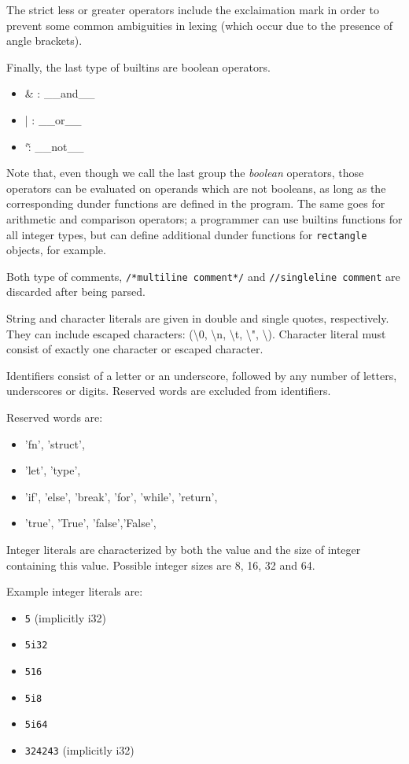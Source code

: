 \documentclass[times, utf8, diplomski]{fer}
\theoremstyle{definition}
\begin{document}
The strict less or greater operators include the exclaimation mark in order to
prevent some common ambiguities in lexing (which occur due to the presence of angle
brackets).

Finally, the last type of builtins are boolean operators.

\begin{itemize}
    \item \& : \_\_and\_\_
    \item | : \_\_or\_\_
    \item \char`\~ : \_\_not\_\_
\end{itemize}

Note that, even though we call the last group the \textit{boolean} operators,
those operators can be evaluated on operands which are not booleans,
as long as the corresponding dunder functions are defined in the program.
The same goes for arithmetic and comparison operators; a programmer can use
builtins functions for all integer types, but can define additional dunder functions
for \texttt{rectangle} objects, for example.

Both type of comments, \texttt{/*multiline comment*/} and \texttt{//singleline comment} are discarded
after being parsed.

String and character literals are given in double and single quotes, respectively.
They can include escaped characters:  (\textbackslash 0, \textbackslash n, \textbackslash t, 
\textbackslash ", \textbackslash \textquotesingle). 
Character literal must consist of exactly one character or escaped character.

Identifiers consist of a letter or an underscore, followed by any number of letters, underscores or digits.
Reserved words are excluded from identifiers.

Reserved words are:
\begin{itemize}
    \item 'fn', 'struct',
    \item 'let', 'type',
    \item 'if', 'else', 'break', 'for', 'while', 'return',
    \item 'true', 'True', 'false','False',
\end{itemize}

Integer literals are characterized by both the value and the size of integer containing this value.
Possible integer sizes are 8, 16, 32 and 64.

Example integer literals are:
\begin{itemize}
    \item \texttt{5} (implicitly i32)
    \item \texttt{5i32}
    \item \texttt{516}
    \item \texttt{5i8}
    \item \texttt{5i64}
    \item \texttt{324243} (implicitly i32)
\end{itemize}
\end{document}
